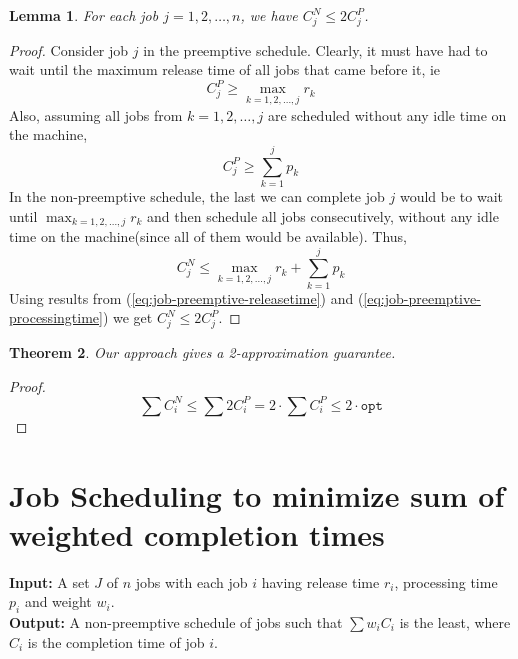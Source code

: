 \documentclass[10pt]{article}
\newtheorem{theorem}{Theorem}[section]
\newtheorem{lemma}[theorem]{Lemma}
\numberwithin{equation}{section}
\begin{document}
\begin{lemma}
For each job $j = 1, 2, \ldots, n$, we have $C_j^N \leq 2C_j^P$.
\end{lemma}
\begin{proof}
Consider job $j$ in the preemptive schedule. Clearly, it must have had to wait until the maximum release time of all jobs that came before it, ie
\begin{equation}\label{eq:job-preemptive-releasetime}
C_j^P \geq \max_{k = 1, 2, \ldots, j}r_k
\end{equation}
Also, assuming all jobs from $k = 1, 2, \ldots, j$ are scheduled without any idle time on the machine,
\begin{equation}\label{eq:job-preemptive-processingtime}
C_j^P \geq \sum_{k = 1}^j p_k
\end{equation}
In the non-preemptive schedule, the last we can complete job $j$ would be to wait until $\max_{k = 1, 2, \ldots, j}r_k$ and then schedule all jobs consecutively, without any idle time on the machine(since all of them would be available). Thus,
\begin{equation}\label{eq:job-preemptive-firstbound}
C_j^N \leq \max_{k = 1, 2, \ldots, j}r_k + \sum_{k = 1}^j p_k
\end{equation}
Using results from (\ref{eq:job-preemptive-releasetime}) and (\ref{eq:job-preemptive-processingtime}) we get $C_j^N \leq 2C_j^P$.
\end{proof}
\bigskip

\begin{theorem}
Our approach gives a 2-approximation guarantee.
\end{theorem}
\begin{proof}
\[
\sum C_i^N \leq \sum 2C_i^P = 2 \cdot \sum C_i^P \leq 2 \cdot \texttt{opt}
\]
\end{proof}


\section{Job Scheduling to minimize sum of weighted completion times}
\textbf{Input: } A set $J$ of $n$ jobs with each job $i$ having release time $r_i$, processing time $p_i$ and weight $w_i$. \\
\textbf{Output: } A non-preemptive schedule of jobs such that $\sum w_iC_i$ is the least, where $C_i$ is the completion time of job $i$. \\
\end{document}

